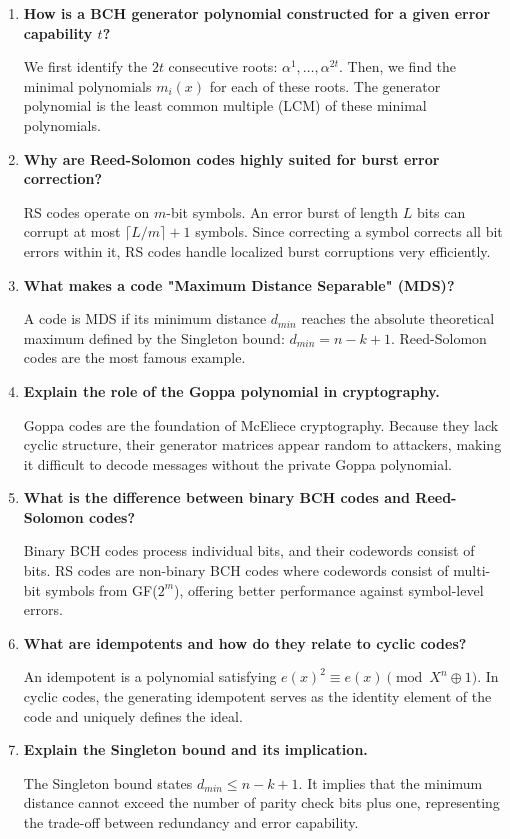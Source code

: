 \documentclass[12pt,a4paper]{article}
\newcommand{\Q}[1]{\textbf{#1}\par\noindent\ignorespaces}
\begin{document}
\begin{tcolorbox}[exambox, title={\textbf{Frequently Asked / Viva Questions}}]
\begin{enumerate}[topsep=0pt, label=\textbf{Q\arabic*.}, itemsep=5pt]
  \item \Q{How is a BCH generator polynomial constructed for a given error capability $t$?}
    We first identify the $2t$ consecutive roots: $\alpha^1, \dots, \alpha^{2t}$. Then, we find the minimal polynomials $m_i(x)$ for each of these roots. The generator polynomial is the least common multiple (LCM) of these minimal polynomials.
  \item \Q{Why are Reed-Solomon codes highly suited for burst error correction?}
    RS codes operate on $m$-bit symbols. An error burst of length $L$ bits can corrupt at most $\lceil L/m \rceil + 1$ symbols. Since correcting a symbol corrects all bit errors within it, RS codes handle localized burst corruptions very efficiently.
  \item \Q{What makes a code "Maximum Distance Separable" (MDS)?}
    A code is MDS if its minimum distance $d_{min}$ reaches the absolute theoretical maximum defined by the Singleton bound: $d_{min} = n - k + 1$. Reed-Solomon codes are the most famous example.
  \item \Q{Explain the role of the Goppa polynomial in cryptography.}
    Goppa codes are the foundation of McEliece cryptography. Because they lack cyclic structure, their generator matrices appear random to attackers, making it difficult to decode messages without the private Goppa polynomial.
  \item \Q{What is the difference between binary BCH codes and Reed-Solomon codes?}
    Binary BCH codes process individual bits, and their codewords consist of bits. RS codes are non-binary BCH codes where codewords consist of multi-bit symbols from GF($2^m$), offering better performance against symbol-level errors.
  \item \Q{What are idempotents and how do they relate to cyclic codes?}
    An idempotent is a polynomial satisfying $e(x)^2 \equiv e(x) \pmod{X^n \oplus 1}$. In cyclic codes, the generating idempotent serves as the identity element of the code and uniquely defines the ideal.
  \item \Q{Explain the Singleton bound and its implication.}
    The Singleton bound states $d_{min} \le n - k + 1$. It implies that the minimum distance cannot exceed the number of parity check bits plus one, representing the trade-off between redundancy and error capability.

\end{enumerate}
\end{tcolorbox}
\end{document}
